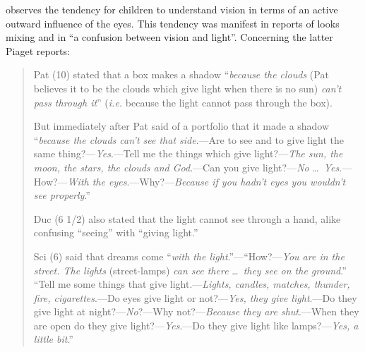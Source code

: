 \citet[48]{Piaget:1929dp} observes the tendency for children to understand vision in terms of an active outward influence of the eyes. This tendency was manifest in reports of looks mixing and in ``a confusion between vision and light''. Concerning the latter Piaget reports:
\begin{quotation}

	Pat (10) stated that a box makes a shadow ``\emph{because the clouds} (Pat believes it to be the clouds which give light when there is no sun) \emph{can't pass through it}'' (\emph{i.e.} because the light cannot pass through the box).
	
	But immediately after Pat said of a portfolio that it made a shadow ``\emph{because the clouds can't see that side}.---Are to see and to give light the same thing?---\emph{Yes}.---Tell me the things which give light?---\emph{The sun, the moon, the stars, the clouds and God}.---Can you give light?---\emph{No} \ldots\ \emph{Yes}.---How?---\emph{With the eyes}.---Why?---\emph{Because if you hadn't eyes you wouldn't see properly}.''
	
	Duc (6 1/2) also stated that the light cannot see through a hand, alike confusing ``seeing'' with ``giving light.''
	
	Sci (6) said that dreams come ``\emph{with the light}.''---``How?---\emph{You are in the street. The lights} (street-lamps) \emph{can see there} \ldots\ \emph{they see on the ground}.'' ``Tell me some things that give light.---\emph{Lights, candles, matches, thunder, fire, cigarettes}.---Do eyes give light or not?---\emph{Yes, they give light}.---Do they give light at night?---\emph{No}?---Why not?---\emph{Because they are shut}.---When they are open do they give light?---\emph{Yes}.---Do they give light like lamps?---\emph{Yes, a little bit}.''
\end{quotation}

